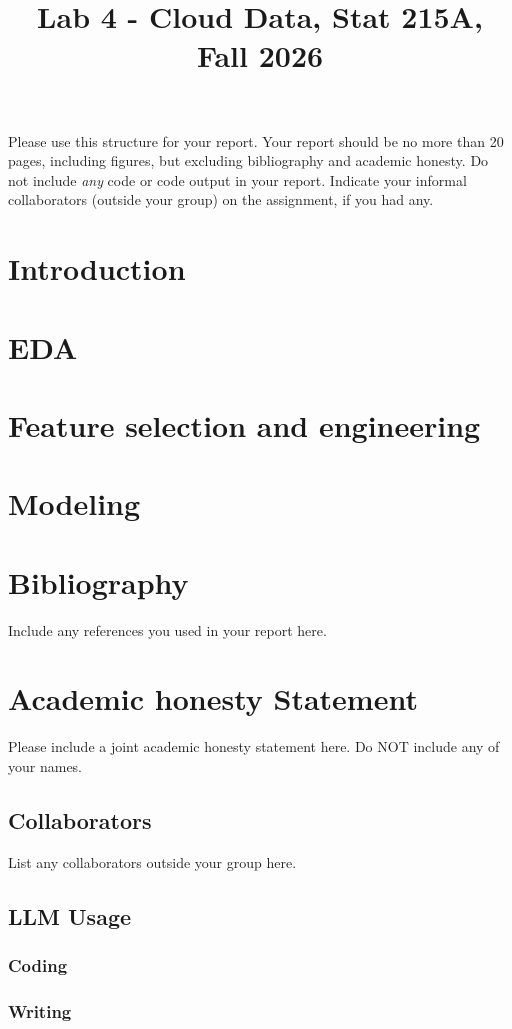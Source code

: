 \documentclass[10pt,letterpaper]{article}
\title{Lab 4 - Cloud Data, Stat 215A, Fall 2026\vspace{-2em}}
\begin{document}
\maketitle

Please use this structure for your report. Your report should be no more than 20 pages, including figures, but excluding bibliography and academic honesty. Do not include \emph{any} code or code output in your report. Indicate your informal collaborators (outside your group) on the assignment, if you had any.

\section{Introduction}

\section{EDA}

\section{Feature selection and engineering}


\section{Modeling}

\section{Bibliography}
Include any references you used in your report here.
\appendix
\section{Academic honesty Statement}
Please include a joint academic honesty statement here. Do NOT include any of your names.
\subsection{Collaborators}
List any collaborators outside your group here.
\subsection{LLM Usage}

\subsubsection*{Coding}

\subsubsection*{Writing}
\end{document}
